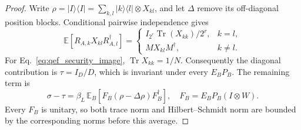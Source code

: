 {\begin{proof}
Write $\rho=|I\rangle\langle I|=\sum_{k,l}|k\rangle\langle l|\otimes X_{kl}$,
and let $\Delta$ remove its off-diagonal position blocks. Conditional
pairwise independence gives
\begin{equation}
 \mathbb E[R_{A,k}X_{kl}R_{A,l}^{\dagger}]
 =\begin{cases}
 I_{2^r}\operatorname{Tr}(X_{kk})/2^r,&k=l,\\
 MX_{kl}M^{\dagger},&k\ne l.
 \end{cases}
\end{equation}
For Eq.~\eqref{eq:qef_security_image},
$\operatorname{Tr}X_{kk}=1/N$. Consequently the diagonal contribution
is $\tau=I_D/D$, which is invariant under every $E_BP_B$. The remaining
term is
\begin{equation}
 \sigma-\tau=\beta_L\,\mathbb E_B
  [F_B(\rho-\Delta\rho)F_B^{\dagger}],
 \quad F_B=E_BP_B(I\otimes W).
\label{eq:qef_off_diagonal_remainder}
\end{equation}
Every $F_B$ is unitary, so both trace norm and Hilbert--Schmidt norm
are bounded by the corresponding norms before this average.


\end{proof}}
